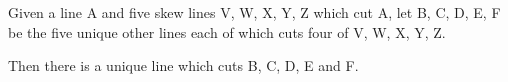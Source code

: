  Given a line A and five skew lines V, W, X, Y, Z which cut A, let
B, C, D, E, F be the five unique other lines each of which
cuts four of  V, W, X, Y, Z.
\par
Then there is a unique line which cuts
B, C, D, E and F.
